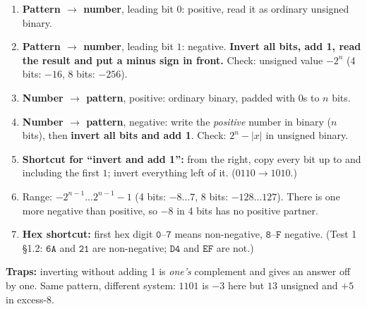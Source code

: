 \documentclass{fkt-notes}
\newcommand{\hx}[1]{\texttt{#1}}
\begin{document}
\begin{rulebox}[title={Method: two's complement with $n$ bits}]
  \begin{enumerate}[nosep]
    \item \textbf{Pattern $\to$ number}, leading bit $0$: positive, read it as ordinary unsigned binary.
    \item \textbf{Pattern $\to$ number}, leading bit $1$: negative. \textbf{Invert all bits, add 1,
          read the result and put a minus sign in front.}
          Check: unsigned value $-2^n$ (4 bits: $-16$, 8 bits: $-256$).
    \item \textbf{Number $\to$ pattern}, positive: ordinary binary, padded with $0$s to $n$ bits.
    \item \textbf{Number $\to$ pattern}, negative: write the \emph{positive} number in binary
          ($n$ bits), then \textbf{invert all bits and add 1}. Check: $2^n-|x|$ in unsigned binary.
    \item \textbf{Shortcut for ``invert and add 1'':} from the right, copy every bit up to and
          including the first $1$; invert everything left of it. ($0110\to1010$.)
    \item Range: $-2^{n-1}\dots2^{n-1}-1$ (4 bits: $-8\dots7$, 8 bits: $-128\dots127$).
          There is one more negative than positive, so $-8$ in 4 bits has no positive partner.
    \item \textbf{Hex shortcut:} first hex digit $\hx{0}$--$\hx{7}$ means non-negative,
          $\hx{8}$--$\hx{F}$ negative. (Test 1 \S1.2: $\hx{6A}$ and $\hx{21}$ are
          non-negative; $\hx{D4}$ and $\hx{EF}$ are not.)
  \end{enumerate}
\end{rulebox}
\textbf{Traps:} inverting without adding 1 is \emph{one's} complement and gives an answer off
by one. Same pattern, different system: $1101$ is $-3$ here but $13$ unsigned and $+5$ in excess-8.
\end{document}
